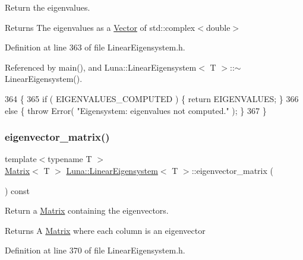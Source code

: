 Return the eigenvalues. 

\begin{DoxyReturn}{Returns}
The eigenvalues as a \hyperlink{classLuna_1_1Vector}{Vector} of std\+::complex$<$double$>$ 
\end{DoxyReturn}


Definition at line 363 of file Linear\+Eigensystem.\+h.



Referenced by main(), and Luna\+::\+Linear\+Eigensystem$<$ T $>$\+::$\sim$\+Linear\+Eigensystem().


\begin{DoxyCode}
364   \{
365     \textcolor{keywordflow}{if} ( EIGENVALUES\_COMPUTED ) \{ \textcolor{keywordflow}{return} EIGENVALUES; \}
366     \textcolor{keywordflow}{else} \{ \textcolor{keywordflow}{throw} Error( \textcolor{stringliteral}{"Eigensystem: eigenvalues not computed."} ); \}
367   \}
\end{DoxyCode}
\mbox{\label{classLuna_1_1LinearEigensystem_ab68a36f7f1c1ecf9da83df84be6e49e9}} 
\subsubsection{\texorpdfstring{eigenvector\+\_\+matrix()}{eigenvector\_matrix()}}
{\footnotesize\ttfamily template$<$typename T $>$ \\
\hyperlink{classLuna_1_1Matrix}{Matrix}$<$ T $>$ \hyperlink{classLuna_1_1LinearEigensystem}{Luna\+::\+Linear\+Eigensystem}$<$ T $>$\+::eigenvector\+\_\+matrix (\begin{DoxyParamCaption}{ }\end{DoxyParamCaption}) const\hspace{0.3cm}{\ttfamily [inline]}}



Return a \hyperlink{classLuna_1_1Matrix}{Matrix} containing the eigenvectors. 

\begin{DoxyReturn}{Returns}
A \hyperlink{classLuna_1_1Matrix}{Matrix} where each column is an eigenvector 
\end{DoxyReturn}


Definition at line 370 of file Linear\+Eigensystem.\+h.



